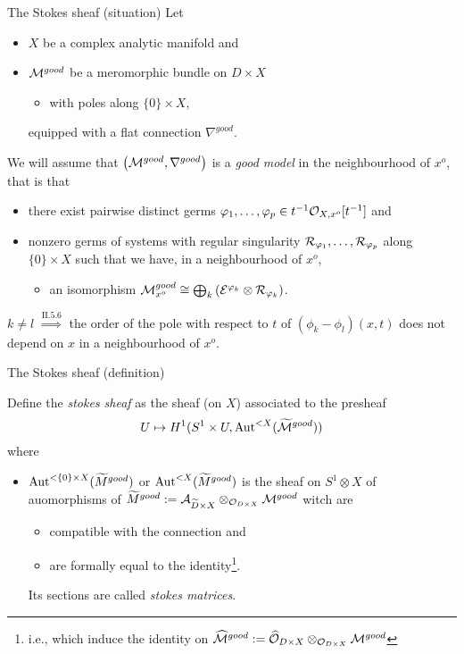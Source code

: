 \begin{frame}[t]{The Stokes sheaf (situation)}
  Let
  \begin{itemize}
    \item $X$ be a complex analytic manifold and
    \item $\mathcal{M}^{good}$ be a meromorphic bundle on $D\times X$
      \begin{itemize}
        \item with poles along $\{0\}\times X$,
      \end{itemize}
      equipped with a flat connection $\nabla^{good}$.
  \end{itemize}
  We will assume that $\left(\mathcal{M}^{good},\nabla^{good}\right)$ is a \emph{good
  model} in the neighbourhood of $x^o$, that is that
  \begin{itemize}
    \item there exist pairwise distinct germs $\varphi_1,\dots,\varphi_p\in
      t^{-1}\mathcal{O}_{X,x^o}[t^{-1}]$ and
    \item nonzero germs of systems with regular singularity
      $\mathcal{R}_{\varphi_1},\dots,\mathcal{R}_{\varphi_p}$ along $\{0\}\times X$ such that
          we have, in a neighbourhood of $x^o$,
      \begin{itemize}
        \item an isomorphism $\mathcal{M}_{x^o}^{good}
          \cong\bigoplus_k\left(\mathcal{E}^{\varphi_k}\otimes\mathcal{R}_{\varphi_k}\right)$.
      \end{itemize}
  \end{itemize}
  $k\neq l$ $\overset{\text{II.5.6}}{\Rightarrow{}}$ the order of the pole with
  respect to $t$ of $(\phi_k-\phi_l)(x,t)$ does not depend on $x$ in a
  neighbourhood of $x^o$.
\end{frame}

\begin{frame}[t]{The Stokes sheaf (definition)}
  \begin{defn}
    Define the \emph{stokes sheaf} as the sheaf (on $X$) associated to the
    presheaf
    \[
      U\mapsto H^1(S^1\times U,\operatorname{Aut}^{<X}(\widetilde {\mathcal{M}}^{good}) )
    \]
    where
    \begin{itemize}
      \item $\operatorname{Aut}^{<\{0\}\times X}(\widetilde M^{good})$ or
        $\operatorname{Aut}^{<X}(\widetilde M^{good})$ is the sheaf on $S^1\otimes X$ of
        auomorphisms of $\widetilde M^{good}:=\mathcal{A}_{\widetilde D\times
        X}\otimes_{\mathcal{O}_{D\times X}}\mathcal{M}^{good}$
        witch are
        \begin{itemize}
          \item compatible with the connection and
          \item are formally equal to the identity\footnote{i.e., which induce
            the identity on $\widehat {\mathcal{M}}^{good}:=\widehat {\mathcal{O}}_{D\times
            X}\otimes_{\mathcal{O}_{D\times X}}\mathcal{M}^{good}$}.
        \end{itemize}
        Its sections are called \emph{stokes matrices}.
    \end{itemize}
  \end{defn}
\end{frame}

